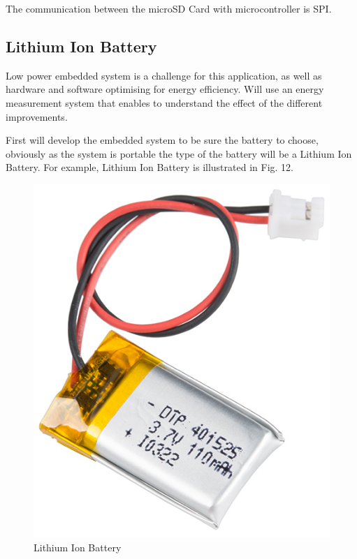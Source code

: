 \documentclass[10pt,journal,compsoc]{IEEEtran}
\begin{document}
%

The communication between the microSD Card with microcontroller is SPI.

%

\subsection{Lithium Ion Battery}

Low power embedded system is a challenge for this application, as well as hardware and software optimising for energy efficiency. Will use an energy measurement system that enables to understand the effect of the different improvements. 

First will develop the embedded system to be sure the battery to choose, obviously as the system is portable the type of the battery will be a Lithium Ion Battery. For example, Lithium Ion Battery is illustrated in Fig. 12.

\begin{figure}[h]
  \centering
  \captionsetup{justification=centering}
  \includegraphics[scale=.3]{es11}
  \caption{Lithium Ion Battery}
  \label{fig:fig12}
\end{figure}
\end{document}
